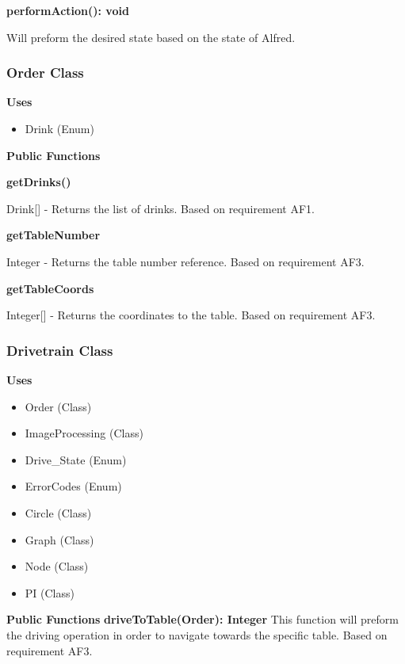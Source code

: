 \documentclass [10pt]{article}
\begin{document}
\textbf{performAction(): void}

Will preform the desired state based on the state of Alfred.


\subsubsection{Order Class}
\textbf{Uses}
\begin{itemize}
	\item Drink (Enum)
\end{itemize}

\textbf{Public Functions}

\textbf{getDrinks()}

Drink[] - Returns the list of drinks. Based on requirement AF1.

\textbf{getTableNumber}

 Integer - Returns the table number reference. Based on requirement AF3.

\textbf{getTableCoords}

 Integer[] - Returns the coordinates to the table. Based on requirement AF3.


\subsubsection{Drivetrain Class}
\textbf{Uses}
\begin{itemize}
	\item Order (Class)
	\item ImageProcessing (Class)
	\item Drive\_State (Enum)
	\item ErrorCodes (Enum)
	\item Circle (Class)
	\item Graph (Class)
	\item Node (Class)
	\item PI (Class)
\end{itemize}

\textbf{Public Functions}
\textbf{driveToTable(Order): Integer}
This function will preform the driving operation in order to navigate towards the specific table. Based on requirement AF3.

\end{document}
